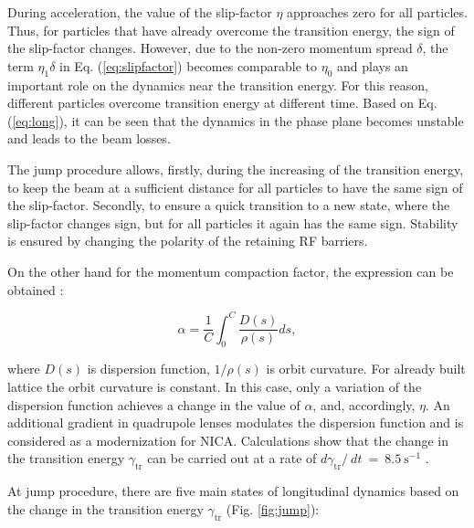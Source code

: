 \documentclass[
aps,%
12pt,%
final,%
notitlepage,%
oneside,%
onecolumn,%
nobibnotes,%
nofootinbib,%
superscriptaddress,%
noshowpacs,%
centertags]%
{revtex4}
\begin{document}
\par During acceleration, the value of the slip-factor $\eta$ approaches zero for all particles. Thus, for particles that have already overcome the transition energy, the sign of the slip-factor changes. However, due to the non-zero momentum spread $\delta$, the term $\eta_1\delta$ in Eq. (\ref{eq:slipfactor}) becomes comparable to $\eta_0$ and plays an important role on the dynamics near the transition energy. For this reason, different particles overcome transition energy at different time. Based on Eq. (\ref{eq:long}), it can be seen that the dynamics in the phase plane becomes unstable and leads to the beam losses. 

\par The jump procedure allows, firstly, during the increasing of the transition energy, to keep the beam at a sufficient distance for all particles to have the same sign of the slip-factor.
Secondly, to ensure a quick transition to a new state, where the slip-factor changes sign, but for all particles it again has the same sign. Stability is ensured by changing the polarity of the retaining RF barriers.

\par On the other hand for the momentum compaction factor, the expression can be obtained \cite{resonant}:

\begin{equation}
\alpha=\frac{1}{C}\int_{0}^{C}{\frac{D\left(s\right)}{\rho\left(s\right)}ds},
\label{eq:alpha}
\end{equation}

\par where $D\left(s\right)$ is dispersion function, $1/\rho\left(s\right)$ is orbit curvature. For already built lattice the orbit curvature is constant. In this case, only a variation of the dispersion function achieves a change in the value of $\alpha$, and, accordingly, $\eta$. An additional gradient in quadrupole lenses modulates the dispersion function and is considered as a modernization for NICA. Calculations show that the change in the transition energy $\gamma_{\text{tr}}$ can be carried out at a rate of $d\gamma_{\text{tr}}/\ dt\ =\ 8.5\ \text{s}^{-1}$ \cite{nica}.

At jump procedure, there are five main states of longitudinal dynamics based on the change in the transition energy $\gamma_{\text{tr}}$ (Fig. \ref{fig:jump}):
\end{document}
